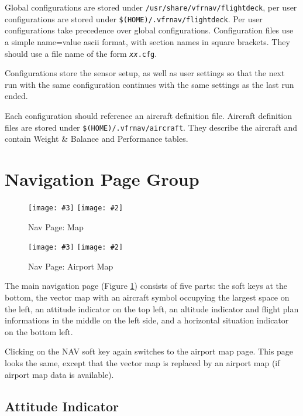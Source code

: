 \documentclass[a4paper,10pt,pdftex]{article}
\newcommand{\jnxfig}[3][]{\ifmypdf\texttt{[image: \#3]}
  \else\texttt{[image: \#2]}\fi}
\begin{document}
Global configurations are stored under {\tt /usr/share/vfrnav/flightdeck},
per user configurations are stored under {\tt \$(HOME)/.vfrnav/flightdeck}.
Per user configurations take precedence over global
configurations. Configuration files use a simple name=value ascii
format, with section names in square brackets. They should use a file
name of the form {\tt {\it xx}.cfg}.

Configurations store the sensor setup, as well as user settings so
that the next run with the same configuration continues with the same
settings as the last run ended.

Each configuration should reference an aircraft definition
file. Aircraft definition files are stored under
{\tt \$(HOME)/.vfrnav/aircraft}. They describe the aircraft and
contain Weight \& Balance and Performance tables.

\clearpage

\section{Navigation Page Group}

\begin{figure}[!htbp]
  \begin{center}
    \jnxfig[scale=0.5]{navmap.eps}{navmap.png}
    \caption{Nav Page: Map}
    \label{fig:navmap}
  \end{center}
\end{figure}

\begin{figure}[!htbp]
  \begin{center}
    \jnxfig[scale=0.5]{navarpt.eps}{navarpt.png}
    \caption{Nav Page: Airport Map}
    \label{fig:navarpt}
  \end{center}
\end{figure}

The main navigation page (Figure \ref{fig:navmap}) consists of five
parts: the soft keys at the bottom, the vector map with an aircraft
symbol occupying the largest space on the left, an attitude indicator
on the top left, an altitude indicator and flight plan informations in
the middle on the left side, and a horizontal situation indicator on
the bottom left.

Clicking on the NAV soft key again switches to the airport map
page. This page looks the same, except that the vector map is replaced
by an airport map (if airport map data is available).

\subsection{Attitude Indicator}
\end{document}
